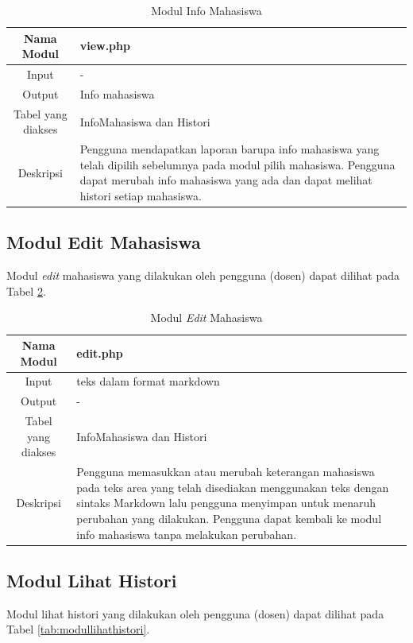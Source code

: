 \begin{table}[h]
\centering
\caption[Tabel Modul Info Mahasiswa]{Modul Info Mahasiswa}
\label{tab:modulinfomahasiswa}
\begin{tabular}{|c|p{7cm}|}
\hline
Nama Modul & view.php\\
\hline
Input & -\\
\hline
Output & Info mahasiswa\\
\hline
Tabel yang diakses & InfoMahasiswa dan Histori\\
\hline
Deskripsi & Pengguna mendapatkan laporan barupa info mahasiswa yang telah
dipilih sebelumnya pada modul pilih mahasiswa. Pengguna dapat merubah info
mahasiswa yang ada dan dapat melihat histori setiap mahasiswa.\\
\hline
\end{tabular}
\end{table}

\subsection{Modul Edit Mahasiswa}
Modul {\it edit} mahasiswa yang dilakukan oleh pengguna (dosen) dapat dilihat
pada Tabel \ref{tab:moduleditmahasiswa}.

\begin{table}[h]
\centering
\caption[Tabel Modul {\it Edit} Mahasiswa]{Modul {\it Edit} Mahasiswa}
\label{tab:moduleditmahasiswa}
\begin{tabular}{|c|p{7cm}|}
\hline
Nama Modul & edit.php\\
\hline
Input & teks dalam format markdown\\
\hline
Output & -\\
\hline
Tabel yang diakses & InfoMahasiswa dan Histori\\
\hline
Deskripsi & Pengguna memasukkan atau merubah keterangan mahasiswa pada teks area
yang telah disediakan menggunakan teks dengan sintaks Markdown lalu
pengguna menyimpan untuk menaruh perubahan yang dilakukan. Pengguna dapat
kembali ke modul info mahasiswa tanpa melakukan perubahan.\\
\hline
\end{tabular}
\end{table}

\subsection{Modul Lihat Histori}
Modul lihat histori yang dilakukan oleh pengguna (dosen) dapat dilihat pada
Tabel \ref{tab:modullihathistori}.

